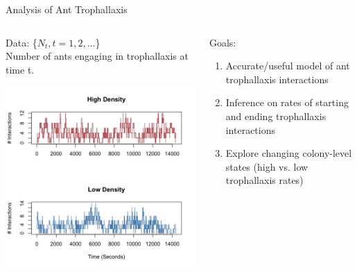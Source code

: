 \documentclass[10pt]{beamer}
\begin{document}
\begin{frame}[fragile]{Analysis of Ant Trophallaxis}


 \begin{columns}[T]
    \begin{column}{.5\textwidth}
     \begin{block}{}
Data: \{$N_t, t = 1, 2, \dots$\} \\
Number of ants engaging in trophallaxis at time t.

 \includegraphics[width=\textwidth]{Data-narrow.jpeg}

\end{block}
    \end{column}
    \begin{column}{.5\textwidth}
    \begin{block}{}
  Goals: 
\begin{enumerate}
\item Accurate/useful model of ant trophallaxis interactions
\item Inference on rates of starting and ending trophallaxis interactions
\item Explore changing colony-level states (high vs. low trophallaxis rates)
\end{enumerate}

    \end{block}
    \end{column}
  \end{columns}

\end{frame}
\end{document}
